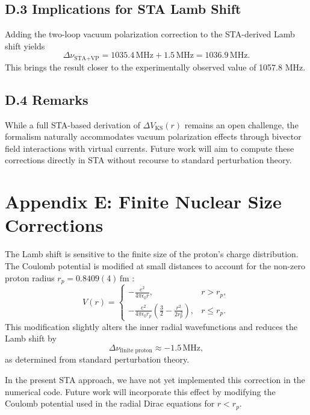 \documentclass[12pt]{article}
\begin{document}
\subsection*{D.3 Implications for STA Lamb Shift}

Adding the two-loop vacuum polarization correction to the STA-derived Lamb shift yields
\[
\Delta\nu_\text{STA+VP} = 1035.4\,\text{MHz} + 1.5\,\text{MHz} = 1036.9\,\text{MHz}.
\]
This brings the result closer to the experimentally observed value of 1057.8 MHz.

\subsection*{D.4 Remarks}

While a full STA-based derivation of \(\Delta V_\text{KS}(r)\) remains an open challenge, the formalism naturally accommodates vacuum polarization effects through bivector field interactions with virtual currents. Future work will aim to compute these corrections directly in STA without recourse to standard perturbation theory.

\appendix
\section*{Appendix E: Finite Nuclear Size Corrections}

The Lamb shift is sensitive to the finite size of the proton’s charge distribution. The Coulomb potential is modified at small distances to account for the non-zero proton radius \(r_p = 0.8409(4)\,\mathrm{fm}\) \cite{CODATA2018}:
\[
V(r) = \begin{cases}
-\frac{e^2}{4\pi\epsilon_0 r}, & r > r_p, \\
-\frac{e^2}{4\pi\epsilon_0 r_p}\left(\frac{3}{2} - \frac{r^2}{2r_p^2}\right), & r \le r_p.
\end{cases}
\]
This modification slightly alters the inner radial wavefunctions and reduces the Lamb shift by
\[
\Delta\nu_\text{finite proton} \approx -1.5\,\mathrm{MHz},
\]
as determined from standard perturbation theory.  

In the present STA approach, we have not yet implemented this correction in the numerical code. Future work will incorporate this effect by modifying the Coulomb potential used in the radial Dirac equations for \(r<r_p\).
\end{document}
